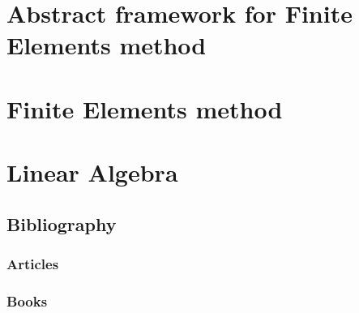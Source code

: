 \documentclass[11pt,fleqn]{book} %
\begin{document}
\part{Abstract framework for Finite Elements method}




\part{Finite Elements method}





\part{Linear Algebra}




\chapter*{Bibliography}


\section*{Articles}
\printbibliography[heading=bibempty,type=article]


\section*{Books}
\printbibliography[heading=bibempty,type=book]
\end{document}
